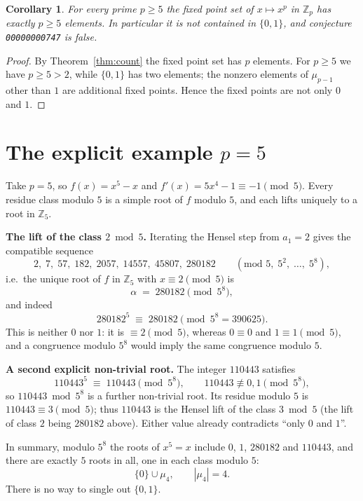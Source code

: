 \documentclass[11pt]{article}
\newtheorem{corollary}[theorem]{Corollary}
\theoremstyle{definition}
\newcommand{\Zp}{\mathbb{Z}_p}
\newcommand{\Z}{\mathbb{Z}}
\begin{document}
\begin{corollary}\label{cor:false}
For every prime $p\ge 5$ the fixed point set of $x\mapsto x^{p}$ in $\Zp$ has
exactly $p\ge 5$ elements. In particular it is \emph{not} contained in
$\{0,1\}$, and conjecture \texttt{00000000747} is false.
\end{corollary}

\begin{proof}
By Theorem~\ref{thm:count} the fixed point set has $p$ elements. For $p\ge 5$
we have $p\ge 5>2$, while $\{0,1\}$ has two elements; the nonzero elements of
$\mu_{p-1}$ other than $1$ are additional fixed points. Hence the fixed points
are not only $0$ and $1$.
\end{proof}

\section{The explicit example $p=5$}\label{sec:p5}

Take $p=5$, so $f(x)=x^{5}-x$ and $f'(x)=5x^{4}-1\equiv -1\pmod 5$. Every
residue class modulo $5$ is a simple root of $f$ modulo $5$, and each lifts
uniquely to a root in $\Z_5$.

\medskip
\noindent\textbf{The lift of the class $2 \bmod 5$.}
Iterating the Hensel step from $a_1=2$ gives the compatible sequence
\[
  2,\; 7,\; 57,\; 182,\; 2057,\; 14557,\; 45807,\; 280182
  \qquad (\text{mod } 5,\;5^{2},\;\dots,\;5^{8}),
\]
i.e.\ the unique root of $f$ in $\Z_5$ with $x\equiv 2\pmod 5$ is
\[
  \alpha \;=\; 280182 \pmod{5^{8}},
\]
and indeed
\[
  280182^{5} \;\equiv\; 280182 \pmod{5^{8}=390625}.
\]
This is neither $0$ nor $1$: it is $\equiv 2\pmod 5$, whereas $0\equiv 0$ and
$1\equiv 1\pmod 5$, and a congruence modulo $5^{8}$ would imply the same
congruence modulo $5$.

\medskip
\noindent\textbf{A second explicit non-trivial root.} The integer $110443$
satisfies
\[
  110443^{5} \;\equiv\; 110443 \pmod{5^{8}}, \qquad
  110443 \not\equiv 0,1 \pmod{5^{8}},
\]
so $110443 \bmod 5^{8}$ is a further non-trivial root. Its residue modulo $5$ is
$110443\equiv 3\pmod 5$; thus $110443$ is the Hensel lift of the class
$3\bmod 5$ (the lift of class $2$ being $280182$ above). Either value already
contradicts ``only $0$ and $1$''.

\medskip
In summary, modulo $5^{8}$ the roots of $x^{5}=x$ include $0$, $1$, $280182$ and
$110443$, and there are exactly $5$ roots in all, one in each class modulo $5$:
\[
  \{0\}\cup\mu_4, \qquad |\mu_4|=4 .
\]
There is no way to single out $\{0,1\}$.
\end{document}
